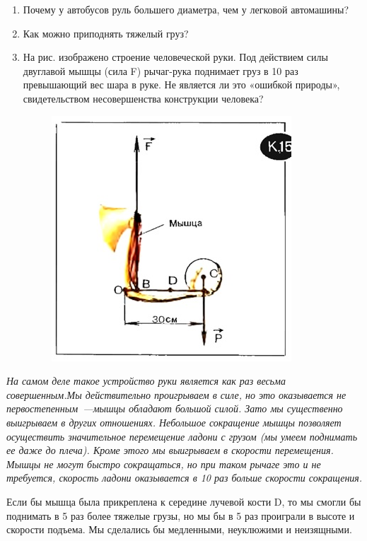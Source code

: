 \begin{enumerate}
	\item Почему у автобусов руль большего диаметра, чем у легковой автомашины?
	\item Как можно приподнять тяжелый груз?
	\item  На рис. изображено строение человеческой руки. Под действием силы двуглавой мышцы (сила F) рычаг-рука поднимает груз в 10 раз превышающий вес шара в руке. Не является ли это «ошибкой природы», свидетельством несовершенства конструкции человека?
	\clearpage
	\begin{figure}[h!]
		\begin{center}
			\includegraphics[width=1\linewidth]{chapters/chapter20/images/2}
			\caption{}
			\label{ris:image20x2}
		\end{center}
	\end{figure}	
\end{enumerate}

{\slshape На самом деле такое устройство руки является как раз весьма совершенным.Мы действительно проигрываем в силе, но это оказывается не первостепенным~---мышцы обладают большой силой. Зато мы существенно выигрываем в других отношениях. Небольшое сокращение мышцы позволяет осуществить значительное перемещение ладони с грузом (мы умеем поднимать ее даже до плеча). Кроме этого мы выигрываем в скорости перемещения. Мышцы не могут быстро сокращаться, но при таком рычаге это и не требуется, скорость ладони оказывается в 10 раз больше скорости сокращения.
	
	Если бы мышца была прикреплена к середине лучевой кости D, то мы смогли бы поднимать в 5 раз более тяжелые грузы, но мы бы в 5 раз проиграли в высоте и скорости подъема. Мы сделались бы медленными, неуклюжими и неизящными.}

